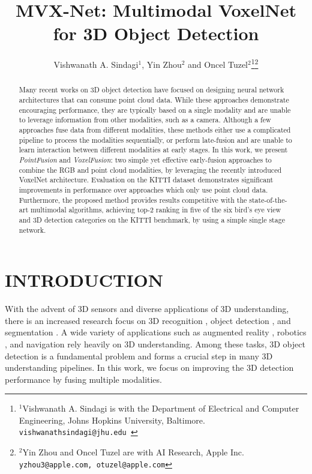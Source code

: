 \documentclass[letterpaper, 10 pt, conference]{ieeeconf}
\title{\LARGE \bf
MVX-Net: Multimodal VoxelNet for 3D Object Detection
}
\author{Vishwanath A. Sindagi$^{1}$, Yin Zhou$^{2}$ and Oncel Tuzel$^{2}$\thanks{$^{1}$Vishwanath A. Sindagi is with the  Department of Electrical and Computer Engineering, Johns Hopkins University, Baltimore.
        {\tt\small vishwanathsindagi@jhu.edu }}\thanks{$^{2}$Yin Zhou and Oncel Tuzel are with AI Research, Apple Inc.
        {\tt\small yzhou3@apple.com, otuzel@apple.com}}}
\begin{document}
\maketitle
\thispagestyle{empty}
\pagestyle{empty}


\begin{abstract}

Many recent works on 3D object detection have focused on designing neural network architectures that can consume point cloud data. While these approaches demonstrate encouraging performance, they are typically based on a single modality and are unable to leverage information from other modalities, such as a camera. Although a few approaches fuse data from different modalities, these methods either use a complicated pipeline to process the modalities sequentially, or perform late-fusion and are unable to learn interaction between different modalities at early stages. In this work, we present \textit{PointFusion} and \textit{VoxelFusion}: two simple yet effective early-fusion approaches to combine the RGB and point cloud modalities, by leveraging the recently introduced VoxelNet architecture. 
Evaluation on the KITTI dataset demonstrates significant improvements in performance over approaches which only use point cloud data. Furthermore, the proposed method provides results competitive with the state-of-the-art multimodal algorithms, achieving top-2 ranking in five of the six bird’s eye view and 3D detection categories on the KITTI benchmark, by using a simple single stage network.




\end{abstract}


\section{INTRODUCTION}


With the advent of 3D sensors and diverse applications of 3D understanding, there is an increased research focus on 3D recognition \cite{xiang2016objectnet3d}, object detection \cite{REF:zhou2017voxelnet,REF:qi2017frustum}, and segmentation \cite{REF:qi2017pointnet}. A wide variety of applications such as augmented reality \cite{REF:AR}, robotics \cite{REF:Housekeeping}, and navigation \cite{REF:Geiger2012CVPR,REF:Drone} rely heavily on 3D understanding. Among these tasks, 3D object detection is a fundamental problem and forms a crucial step in many 3D understanding pipelines. In this work, we focus on improving the 3D detection performance by fusing multiple modalities. 
\end{document}
